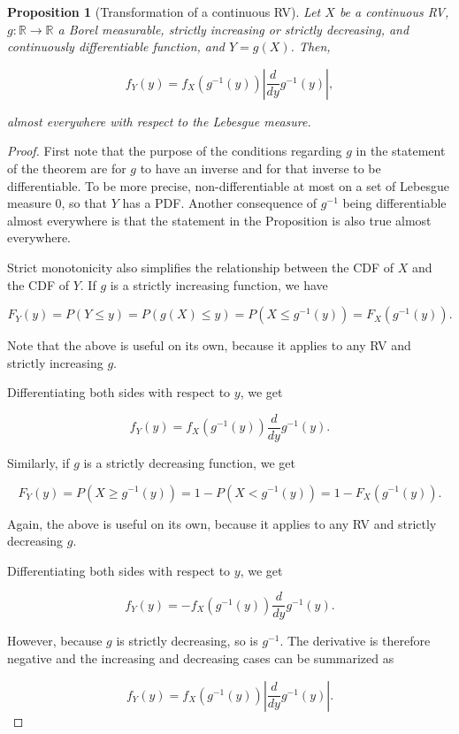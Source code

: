 \documentclass{book}
\theoremstyle{plain}%
\newtheorem{proposition}{Proposition}[section]
\theoremstyle{definition}
\newlength{\arrow}
\begin{document}
\begin{proposition}[Transformation of a continuous RV]
Let $X$ be a continuous RV, $g: \mathbb{R} \rightarrow \mathbb{R}$ a Borel measurable, strictly increasing or strictly decreasing, and continuously differentiable function, and $Y = g(X)$. Then,

$$f_Y(y) = f_X(g^{-1}(y)) |\frac{d}{dy}g^{-1}(y)|,$$

almost everywhere with respect to the Lebesgue measure.
\end{proposition}

\begin{proof} First note that the purpose of the conditions regarding $g$ in the statement of the theorem are for $g$ to have an inverse and for that inverse to be differentiable. To be more precise, non-differentiable at most on a set of Lebesgue measure 0, so that $Y$ has a PDF. Another consequence of $g^{-1}$ being differentiable almost everywhere is that the statement in the Proposition is also true almost everywhere.

Strict monotonicity also simplifies the relationship between the CDF of $X$ and the CDF of $Y$. If $g$ is a strictly increasing function, we have

$$F_Y(y) = P(Y \leq y) = P(g(X) \leq y) = P(X \leq g^{-1}(y)) = F_X(g^{-1}(y)).$$

Note that the above is useful on its own, because it applies to any RV and strictly increasing $g$.

Differentiating both sides with respect to $y$, we get

$$f_Y(y) = f_X(g^{-1}(y)) \frac{d}{dy}g^{-1}(y).$$

Similarly, if $g$ is a strictly decreasing function, we get

$$F_Y(y) = P(X \geq g^{-1}(y)) = 1 - P(X < g^{-1}(y)) = 1 - F_X(g^{-1}(y)).$$

Again, the above is useful on its own, because it applies to any RV and strictly decreasing $g$.

Differentiating both sides with respect to $y$, we get

$$f_Y(y) = - f_X(g^{-1}(y)) \frac{d}{dy}g^{-1}(y).$$

However, because $g$ is strictly decreasing, so is $g^{-1}$. The derivative is therefore negative and the increasing and decreasing cases can be summarized as

$$f_Y(y) = f_X(g^{-1}(y)) |\frac{d}{dy}g^{-1}(y)|.$$
\end{proof}
\end{document}
